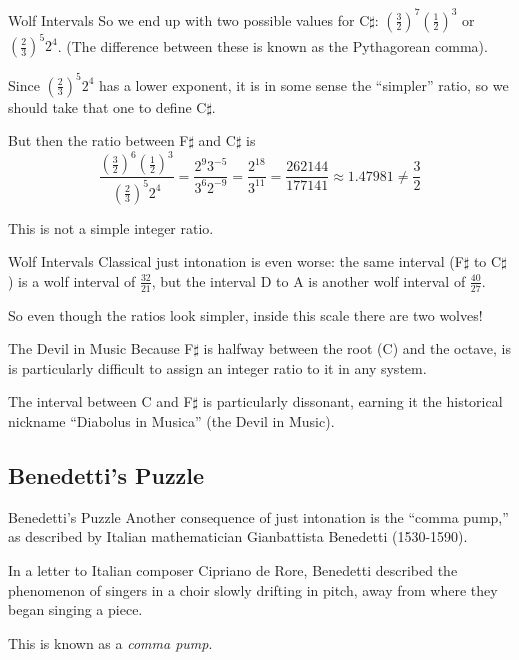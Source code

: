 \documentclass{beamer}
\begin{document}
\begin{frame}{Wolf Intervals}
    So we end up with two possible values for C$\sharp$: $\left( \frac{3}{2} \right)^7 \left( \frac{1}{2} \right)^{3}$ or $\left( \frac{2}{3} \right)^5 2^4$. (The difference between these is known as the Pythagorean comma).
    
    \pause Since $\left( \frac{2}{3} \right)^5 2^4$ has a lower exponent, it is in some sense the ``simpler'' ratio, so we should take that one to define C$\sharp$.
    
    \pause But then the ratio between F$\sharp$ and C$\sharp$ is
    \[
        \frac{\left( \frac{3}{2} \right)^6 \left( \frac{1}{2} \right)^{3}}{\left( \frac{2}{3} \right)^5 2^4}
        = \frac{2^9 3^{-5}}{3^6 2^{-9}}
        = \frac{2^{18}}{3^{11}}
        = \frac{262144}{177141}
        \approx 1.47981
        \neq \frac{3}{2}
    \]
    
    \pause This is not a simple integer ratio.
\end{frame}

\begin{frame}{Wolf Intervals}
    \pause Classical just intonation is even worse: the same interval (F$\sharp$ to C$\sharp$) is a wolf interval of $\frac{32}{21}$, but the interval D to A is another wolf interval of $\frac{40}{27}$.
    
    \pause So even though the ratios look simpler, inside this scale there are two wolves!
\end{frame}

\begin{frame}{The Devil in Music}
    \pause Because F$\sharp$ is halfway between the root (C) and the octave, is is particularly difficult to assign an integer ratio to it in any system.
    
    \pause The interval between C and F$\sharp$ is particularly dissonant, earning it the historical nickname ``Diabolus in Musica'' (the Devil in Music).
\end{frame}

\subsection{Benedetti's Puzzle}
\begin{frame}{Benedetti's Puzzle}
    \pause Another consequence of just intonation is the ``comma pump,'' as described by Italian mathematician Gianbattista Benedetti (1530-1590).
    
    \pause In a letter to Italian composer Cipriano de Rore, Benedetti described the phenomenon of singers in a choir slowly drifting in pitch, away from where they began singing a piece.
    
    \pause This is known as a \textit{comma pump}.
\end{frame}
\end{document}
